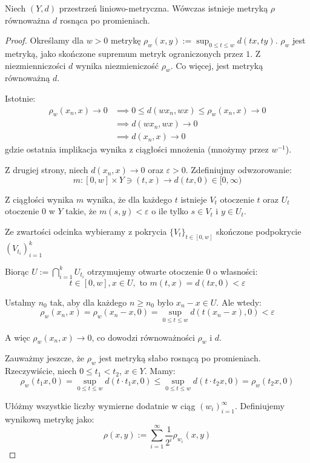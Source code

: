 \begin{thm} \label{thm:eidelheit-mazur}
  Niech $(Y, d)$ przestrzeń liniowo-metryczna. Wówczas istnieje metryką $\rho$ równoważna $d$ rosnąca po promieniach.
  \begin{proof}
    Określamy dla $w > 0$ metrykę $\rho_w(x, y) := \sup_{0 \leq t \leq w} d(tx, ty)$. $\rho_w$ jest metryką, jako skończone supremum metryk ograniczonych przez $1$. Z niezmienniczości $d$ wynika niezmieniczość $\rho_w$. Co więcej, jest metryką równoważną $d$.
    
    Istotnie:
    \begin{align*}
      \rho_w(x_n, x) \to 0 &\implies 0 \leq d(w x_n, wx) \leq \rho_w(x_n,x)  \to 0 \\
      &\implies d(wx_n, wx) \to 0 \\
      &\implies d(x_n, x) \to 0
    \end{align*}
    gdzie ostatnia implikacja wynika z ciągłości mnożenia (mnożymy przez $w^{-1}$).
    
    Z drugiej strony, niech $d(x_n, x) \to 0$ oraz $\varepsilon > 0$. Zdefiniujmy odwzorowanie:
    \[m: [0,w] \times Y \ni (t,x) \to d(tx, 0) \in [0,\infty)\]
    
    Z ciągłości wynika $m$ wynika, że dla każdego $t$ istnieje $V_t$ otoczenie $t$ oraz $U_t$ otoczenie $0$ w $Y$ takie, że $m(s, y) < \varepsilon$ o ile tylko $s \in V_t$ i $y \in U_t$.
    
    Ze zwartości odcinka wybieramy z pokrycia $\{V_t\}_{t \in [0,w]}$ skończone podpokrycie $(V_{t_i})_{i=1}^{k}$
    
    Biorąc $U := \bigcap_{i=1}^k U_{t_i}$ otrzymujemy otwarte otoczenie $0$ o własności:
    \[t \in [0,w], x \in U,\mbox{ to } m(t,x) = d(tx, 0) < \varepsilon\]
    
    Ustalmy $n_0$ tak, aby dla każdego $n \geq n_0$ było $x_n - x \in U$. Ale wtedy:
    \[\rho_w(x_n, x) = \rho_w(x_n - x, 0) = \sup_{0 \leq t \leq w} d(t(x_n - x), 0) < \varepsilon\]
    
    A więc $\rho_w(x_n, x) \to 0$, co dowodzi równoważności $\rho_w$ i $d$.
    
    Zauważmy jeszcze, że $\rho_w$ jest metryką słabo rosnącą po promieniach. Rzeczywiście, niech $0 \leq t_1 < t_2$, $x \in Y$. Mamy:
    \[\rho_w(t_1 x, 0) = \sup_{0 \leq t \leq w} d(t \cdot t_1 x, 0) \leq \sup_{0 \leq t \leq w} d(t \cdot t_2 x, 0) = \rho_w(t_2 x, 0)\]
    
    Ułóżmy wszystkie liczby wymierne dodatnie w ciąg $(w_i)_{i=1}^\infty$. Definiujemy wynikową metrykę jako:
    \[\rho(x, y) := \sum_{i=1}^\infty \frac{1}{2^i} \rho_{w_i}(x, y)\]
    

\end{proof}
\end{thm}
